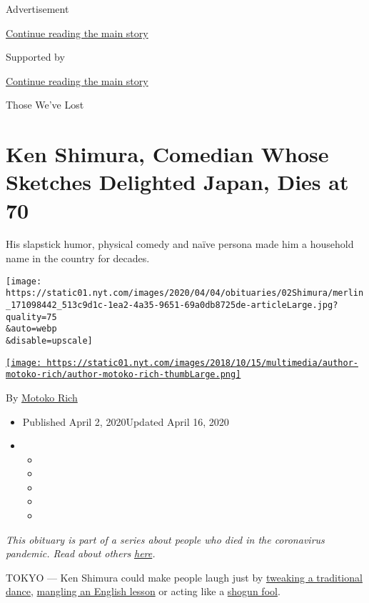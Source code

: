 Advertisement

\protect\hyperlink{after-top}{Continue reading the main story}

Supported by

\protect\hyperlink{after-sponsor}{Continue reading the main story}

Those We've Lost

\hypertarget{ken-shimura-comedian-whose-sketches-delighted-japan-dies-at-70}{%
\section{Ken Shimura, Comedian Whose Sketches Delighted Japan, Dies at
70}\label{ken-shimura-comedian-whose-sketches-delighted-japan-dies-at-70}}

His slapstick humor, physical comedy and naïve persona made him a
household name in the country for decades.

\texttt{[image: https://static01.nyt.com/images/2020/04/04/obituaries/02Shimura/merlin\_171098442\_513c9d1c-1ea2-4a35-9651-69a0db8725de-articleLarge.jpg?quality=75\\\&auto=webp\\\&disable=upscale]}

\href{https://www.nytimes.com/by/motoko-rich}{\texttt{[image: https://static01.nyt.com/images/2018/10/15/multimedia/author-motoko-rich/author-motoko-rich-thumbLarge.png]}}

By \href{https://www.nytimes.com/by/motoko-rich}{Motoko Rich}

\begin{itemize}
\item
  Published April 2, 2020Updated April 16, 2020
\item
  \begin{itemize}
  \item
  \item
  \item
  \item
  \item
  \end{itemize}
\end{itemize}

\emph{This obituary is part of a series about people who died in the
coronavirus pandemic. Read about others}
\href{https://www.nytimes.com/series/people-who-have-died-of-the-coronavirus}{\emph{here}}\emph{.}

TOKYO --- Ken Shimura could make people laugh just by
\href{https://www.youtube.com/watch?v=fkdsvAbezj4}{tweaking a
traditional dance},
\href{https://www.youtube.com/watch?v=Ic53hhFllPM}{mangling an English
lesson} or acting like a
\href{https://www.youtube.com/watch?v=UpO5BG96420}{shogun fool}.

